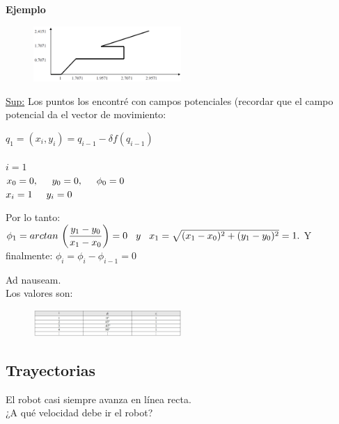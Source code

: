 \textbf{Ejemplo}



\begin{figure}[h!]
	\centering
	\includegraphics[width=0.5\textwidth]{images/img63.png}
	\label{figura63}
\end{figure}


\underline{Sup:} Los puntos los encontré con campos potenciales (recordar que el campo potencial da el vector de
movimiento:

$q_1=(x_i,y_i) = q_{i-1} - \delta f (q_{i-1})$
\\ \\
$ i=1 $ \\
$ x_0 = 0, \hspace{0.5cm} y_0=0, \hspace{0.5cm} \phi_0=0 $ \\
$x_i =1 \hspace{0.5cm} y_i=0 $

Por lo tanto: $\phi_1 =  arctan \, \left( \dfrac{y_1-y_0}{x_1-x_0} \right) = 0 \hspace{0.3cm} y \hspace{0.3cm} x_1 = \sqrt{(x_1-x_0)^2 + (y_1-y_0)^2} = 1.$ Y finalmente: \hspace{0.3cm} $\phi_i=\phi_i-\phi_{i-1} = 0$

Ad nauseam. \\
Los valores son:

\begin{figure}[h!]
	\centering
	\includegraphics[width=0.5\textwidth]{images/img64.png}
	\label{figura64}
\end{figure}



\subsection{Trayectorias}

El robot casi siempre avanza en línea recta. \\
¿A qué velocidad debe ir el robot?

